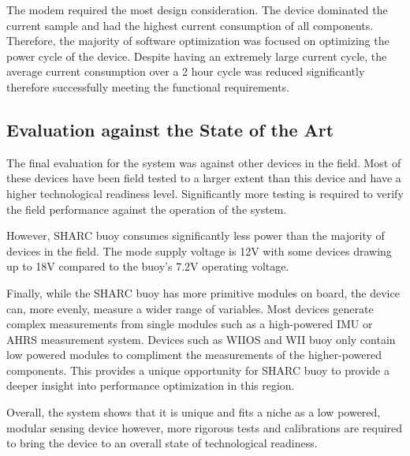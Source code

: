 The modem required the most design consideration. The device dominated the current sample and had the highest current consumption of all components. Therefore, the majority of software optimization was focused on optimizing the power cycle of the device. Despite having an extremely large current cycle, the average current consumption over a 2 hour cycle was reduced significantly therefore successfully meeting the functional requirements.

\subsection{Evaluation against the State of the Art}

The final evaluation for the system was against other devices in the field. Most of these devices have been field tested to a larger extent than this device and have a higher technological readiness level. Significantly more testing is required to verify the field performance against the operation of the system.\par

However, SHARC buoy consumes significantly less power than the majority of devices in the field. The mode supply voltage is 12V with some devices drawing up to 18V compared to the buoy's 7.2V operating voltage.\par 

Finally, while the SHARC buoy has more primitive modules on board, the device can, more evenly, measure a wider range of variables. Most devices generate complex measurements from single modules such as a high-powered IMU or AHRS measurement system. Devices such as WIIOS and WII buoy only contain low powered modules to compliment the measurements of the higher-powered components. This provides a unique opportunity for SHARC buoy to provide a deeper insight into performance optimization in this region.\par 

Overall, the system shows that it is unique and fits a niche as a low powered, modular sensing device however, more rigorous tests and calibrations are required to bring the device to an overall state of technological readiness.
